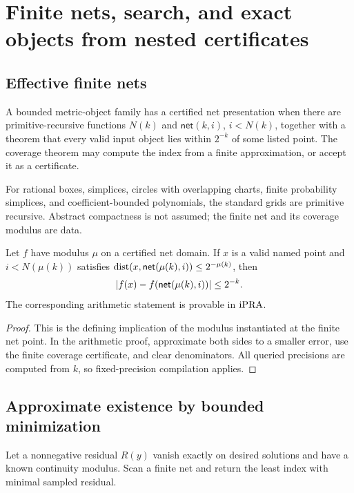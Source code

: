 \section{Finite nets, search, and exact objects from nested certificates}
\label{sec:existence}

\subsection{Effective finite nets}

\begin{definition}
A bounded metric-object family has a certified net presentation when there are
primitive-recursive functions \(N(k)\) and \(\mathsf{net}(k,i)\),
\(i<N(k)\), together with a theorem that every valid input object lies within
\(2^{-k}\) of some listed point.  The coverage theorem may compute the index
from a finite approximation, or accept it as a certificate.
\end{definition}

For rational boxes, simplices, circles with overlapping charts, finite
probability simplices, and coefficient-bounded polynomials, the standard grids
are primitive recursive.  Abstract compactness is not assumed; the finite net
and its coverage modulus are data.

\begin{theorem}
\label{thm:net-transfer}
Let \(f\) have modulus \(\mu\) on a certified net domain.  If \(x\) is a
valid named point and \(i<N(\mu(k))\) satisfies
\(\operatorname{dist}(x,\mathsf{net}(\mu(k),i))\le2^{-\mu(k)}\), then
\[
 \left|f(x)-f(\mathsf{net}(\mu(k),i))\right|\le2^{-k}.
\]
The corresponding arithmetic statement is provable in \(\mathrm{iPRA}\).
\end{theorem}

\begin{proof}
This is the defining implication of the modulus instantiated at the finite net
point.  In the arithmetic proof, approximate both sides to a smaller error,
use the finite coverage certificate, and clear denominators.  All queried
precisions are computed from \(k\), so fixed-precision compilation applies.
\end{proof}

\subsection{Approximate existence by bounded minimization}

Let a nonnegative residual \(R(y)\) vanish exactly on desired solutions and
have a known continuity modulus.  Scan a finite net and return the least index
with minimal sampled residual.

